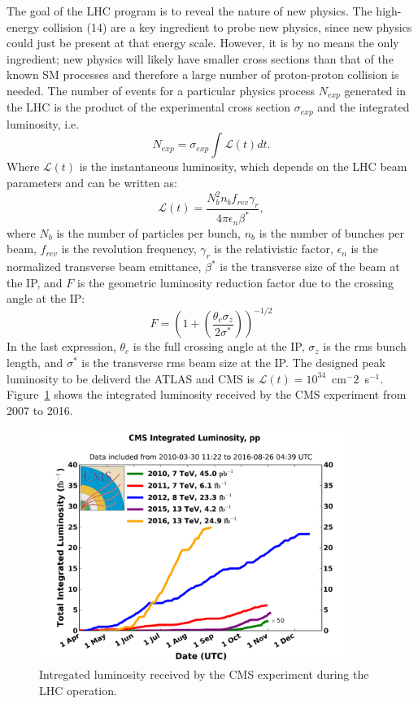 The goal of the LHC program is to reveal the nature of new
physics. The high-energy collision (14\TeV) are a key ingredient to probe new
physics, since new physics could just be present at that energy
scale. However, it is by no means the only ingredient; new physics
will likely have smaller cross sections than that of the known SM
processes and therefore a large number of proton-proton collision is
needed. The number of events for a particular physics process $N_{exp}$
generated in the LHC is the product of the experimental cross section $\sigma_{exp}$
and the integrated luminosity, i.e.
\begin{equation}
N_{exp} = \sigma_{exp}\int\mathcal{L}(t)dt.
\end{equation}
Where $\mathcal{L}(t)$ is the instantaneous luminosity, which depends
on the LHC beam parameters and can be written as\cite{LHCbeamParam}:
\begin{equation}
\mathcal{L}(t) = \frac{N^{2}_{b}n_{b}f_{rev}\gamma_{r}}{4\pi\epsilon_{n}\beta^{*}},
\end{equation}
where $N_{b}$ is the number of particles per bunch, $n_{b}$ is the
number of bunches per beam, $f_{rev}$ is the revolution frequency,
$\gamma_{r}$ is the relativistic factor, $\epsilon_{n}$ is the
normalized transverse beam emittance, $\beta^{*}$ is the transverse
size of the beam at the IP, and $F$ is the geometric luminosity
reduction factor due to the crossing angle at the IP:
\begin{equation}
F=\left(1+\left(\frac{\theta_{c}\sigma_{z}}{2\sigma^{*}}\right)\right)^{-1/2}
\end{equation}
In the last expression, $\theta_{c}$ is the full crossing angle at the
IP, $\sigma_{z}$ is the rms bunch length, and $\sigma^{*}$ is the
transverse rms beam size at the IP. The designed peak luminosity to be
deliverd the ATLAS and CMS is $\mathcal{L}(t) = 10^{34}$~cm$^-2$~s$^{-1}$.  
Figure~\ref{fig:lumi} shows the integrated luminosity
received by the CMS experiment from 2007 to 2016. 
\begin{figure}
 \centering
 \includegraphics[width=0.9\textwidth]{LHC_fig/int_lumi_cumulative_pp_2.png}
 \caption{Intregated luminosity received by the CMS experiment during the LHC operation.\label{fig:lumi} }
\end{figure}

